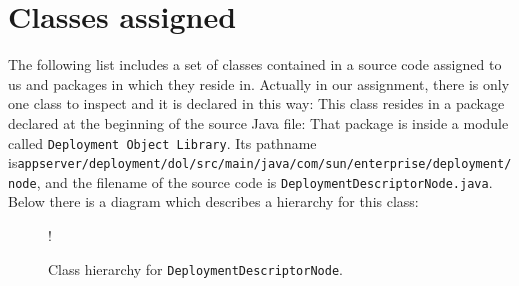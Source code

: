 \newpage
\section{Classes assigned}
The following list includes a set of classes contained in a source code assigned to us and packages in which they reside in.
Actually in our assignment, there is only one class to inspect and it is declared in this way:
This class resides in a package declared at the beginning of the source Java file:
That package is inside a module called \texttt{Deployment Object Library}. \newline
Its pathname is\newline \texttt{appserver/deployment/dol/src/main/java/com/sun/enterprise/deployment/node}, and the filename of the source code is \texttt{DeploymentDescriptorNode.java}.
Below there is a diagram which describes a hierarchy for this class:
\begin{figure}[H]
	\centering
	\resizebox{2.5in}
	{!}{}
	\caption{Class hierarchy for \texttt{DeploymentDescriptorNode}.}
\end{figure}
